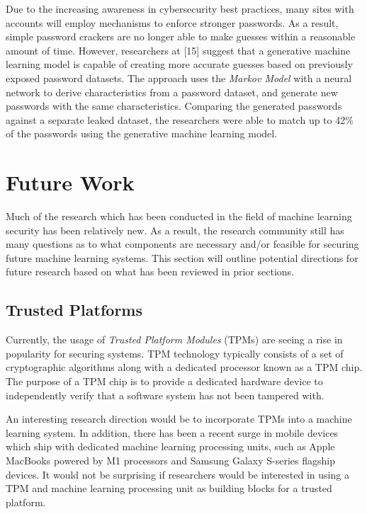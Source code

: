 \documentclass[11pt,conference]{IEEEtran}
\begin{document}
Due to the increasing awareness in cybersecurity best practices, many sites
with accounts will employ mechanisms to enforce stronger passwords. As a
result, simple password crackers are no longer able to make guesses 
within a reasonable amount of time. However, researchers at [15] suggest that a
generative machine learning model is capable of creating more accurate guesses
based on previously exposed password datasets. The approach uses the
\emph{Markov Model} with a neural network to derive characteristics from a
password dataset, and generate new passwords with the same characteristics.
Comparing the generated passwords against a separate leaked dataset, the
researchers were able to match up to 42\% of the passwords using the generative
machine learning model.

\section{Future Work}
Much of the research which has been conducted in the field of machine learning
security has been relatively new. As a result, the research community still has
many questions as to what components are necessary and/or feasible for securing
future machine learning systems.
This section will outline potential directions for future research based on
what has been reviewed in prior sections.

\subsection{Trusted Platforms}
Currently, the usage of \emph{Trusted Platform Modules} (TPMs) are seeing a
rise in popularity for securing systems. TPM technology typically consists of a
set of cryptographic algorithms along with a dedicated processor known as a TPM
chip. The purpose of a TPM chip is to provide a dedicated hardware device to
independently verify that a software system has not been tampered with. 

An interesting research direction would be to incorporate TPMs into a machine
learning system. In addition, there has been a recent surge in mobile devices
which ship with dedicated machine learning processing units, such as Apple
MacBooks powered by M1 processors and Samsung Galaxy S-series flagship devices.
It would not be surprising if researchers would be interested in using a TPM
and machine learning processing unit as building blocks for a trusted platform.
\end{document}
